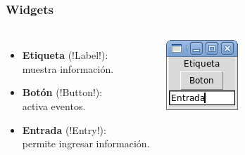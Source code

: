 \documentclass[12pt]{beamer}
\begin{document}
  \begin{frame}
    \frametitle{Widgets}
    \begin{columns}
        \begin{itemize}
          \item \textbf{Etiqueta} (\li!Label!): \\ muestra información.
          \item \textbf{Botón} (\li!Button!):   \\ activa eventos.
          \item \textbf{Entrada} (\li!Entry!): \\ permite ingresar información.
        \end{itemize}
        \includegraphics[width=\textwidth]{programas/tkinter/capturas/widgets.png}
    \end{columns}
  \end{frame}
\end{document}
